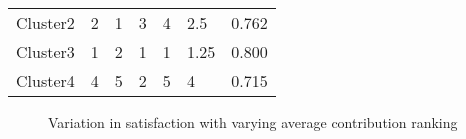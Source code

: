 \begin{table}[h]
\begin{tabular}{@{}lllllll@{}}
Cluster2                    & 2                                                                              & 1                                                                                   & 3                                                                                   & 4                                                                             & 2.5                                                                            & 0.762                                                                               \\
Cluster3                    & 1                                                                              & 2                                                                                   & 1                                                                                   & 1                                                                             & 1.25                                                                           & 0.800                                                                               \\
Cluster4                    & 4                                                                              & 5                                                                                   & 2                                                                                   & 5                                                                             & 4                                                                              & 0.715                                                                               \\ \bottomrule
\end{tabular}
\end{table}

\begin{figure} 
	\centering
	\setlength\figureheight{6cm} 
	\setlength\figurewidth{13cm} 
	 
	\caption{Variation in satisfaction with varying average contribution ranking} 
	\label{fig:SatisfactionVsRanking} 
\end{figure}

\clearpage
